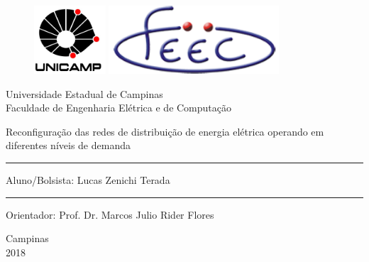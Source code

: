 \begin{titlepage}
\begin{figure}[H]
    \begin{minipage}{.5\linewidth}
        \flushleft
        \includegraphics[width=.94in, height=1in,
            keepaspectratio=true]{01_img/logo_unicamp.jpg}
    \end{minipage}%
    \begin{minipage}{.5\linewidth}
        \flushright
        \includegraphics[width=.94in, height=1in,
            keepaspectratio=true]{01_img/logo_feec.png}
    \end{minipage} 
\end{figure}

    
    \begin{center}
    \large{Universidade Estadual de Campinas}\\
    \large{Faculdade de Engenharia Elétrica e de Computação}
    \end{center}
    
    
    \vspace*{4.8cm}
    
    \begin{center}
    {\sc \Large  Reconfiguração das redes de distribuição de energia elétrica operando em diferentes níveis de demanda}
    \end{center}
    
    
    \vspace*{3.25cm}
    \begin{minipage}{7cm}
    \small
    
    \rule{6.9cm}{0.2mm} \hfill 
    \end{minipage}
    
    Aluno/Bolsista: Lucas Zenichi Terada
    
    \vspace*{1.25cm}
    \begin{minipage}{7cm}
    \small
    
    \rule{6.9cm}{0.2mm} \hfill 
    \end{minipage}

    Orientador: Prof. Dr. Marcos Julio Rider Flores
    
    
    \null \vfill
    
    \begin{center}
    Campinas\\2018
    \end{center}
\end{titlepage}



